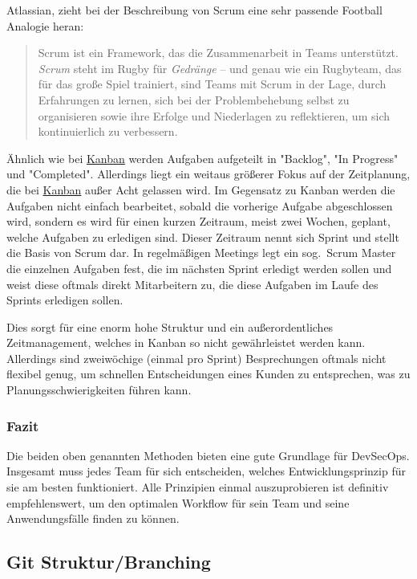 Atlassian, zieht bei der Beschreibung von Scrum eine sehr passende Football Analogie heran\cite{atlassianScrumWasEs}:
\begin{quote}
    Scrum ist ein Framework, das die Zusammenarbeit in Teams unterstützt. \textit{Scrum} steht im Rugby für \textit{Gedränge} – und genau wie ein Rugbyteam, das für das große Spiel trainiert, sind Teams mit Scrum in der Lage, durch Erfahrungen zu lernen, sich bei der Problembehebung selbst zu organisieren sowie ihre Erfolge und Niederlagen zu reflektieren, um sich kontinuierlich zu verbessern.
\end{quote}

Ähnlich wie bei \hyperref[subsubsec:kanban]{Kanban} werden Aufgaben aufgeteilt in "Backlog", "In Progress" und "Completed".
Allerdings liegt ein weitaus größerer Fokus auf der Zeitplanung, die bei \hyperref[subsubsec:kanban]{Kanban} außer Acht gelassen wird.
Im Gegensatz zu Kanban werden die Aufgaben nicht einfach bearbeitet, sobald die vorherige Aufgabe abgeschlossen wird, sondern es wird für einen kurzen Zeitraum, meist zwei Wochen, geplant, welche Aufgaben zu erledigen sind.
Dieser Zeitraum nennt sich Sprint und stellt die Basis von Scrum dar.
In regelmäßigen Meetings legt ein sog.\ Scrum Master die einzelnen Aufgaben fest, die im nächsten Sprint erledigt werden sollen und weist diese oftmals direkt Mitarbeitern zu, die diese Aufgaben im Laufe des Sprints erledigen sollen.

Dies sorgt für eine enorm hohe Struktur und ein außerordentliches Zeitmanagement, welches in Kanban so nicht gewährleistet werden kann.
Allerdings sind zweiwöchige (einmal pro Sprint) Besprechungen oftmals nicht flexibel genug, um schnellen Entscheidungen eines Kunden zu entsprechen, was zu Planungsschwierigkeiten führen kann.

\subsubsection{Fazit}

Die beiden oben genannten Methoden bieten eine gute Grundlage für DevSecOps.
Insgesamt muss jedes Team für sich entscheiden, welches Entwicklungsprinzip für sie am besten funktioniert.
Alle Prinzipien einmal auszuprobieren ist definitiv empfehlenswert, um den optimalen Workflow für sein Team und seine Anwendungsfälle finden zu können.

\subsection{Git Struktur/Branching}\label{subsec:git-struktur/branching}

